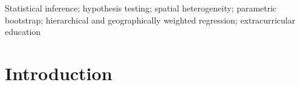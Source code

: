 \documentclass[times]{interact}
\theoremstyle{plain}%
\theoremstyle{definition}
\theoremstyle{remark}
\begin{document}


\begin{keywords}


Statistical inference; hypothesis testing; spatial heterogeneity; parametric bootstrap; hierarchical and geographically weighted regression; extracurricular education
\end{keywords}

\glsresetall
\linenumbers

\section{Introduction}
\label{sec:introduction}
\end{document}
